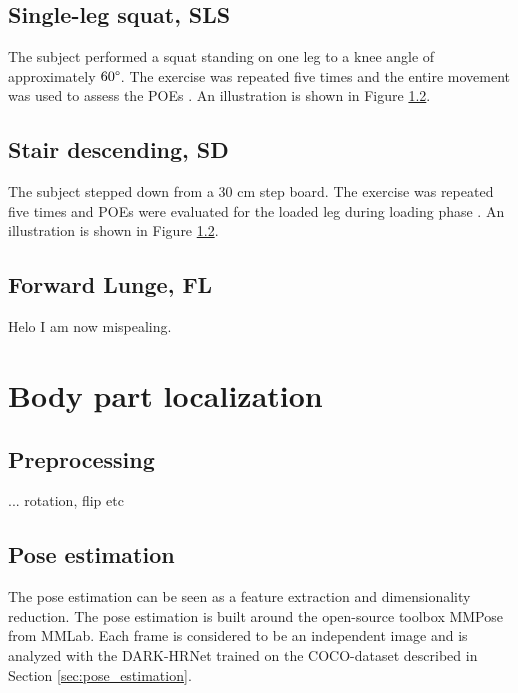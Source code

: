\subsection{Single-leg squat, SLS} \label{sec:met-SLS}
The subject performed a squat standing on one leg to a knee angle of approximately $60\degree$. The exercise was repeated five times and the entire movement was used to assess the POEs \cite{Nae2020}. An illustration is shown in Figure \ref{}.

\subsection{Stair descending, SD}
The subject stepped down from a 30 cm step board. The exercise was repeated five times and POEs were evaluated for the loaded leg during loading phase \cite{Nae2020}. An illustration is shown in Figure \ref{}.

\subsection{Forward Lunge, FL}

Helo I am now mispealing.





\section{Body part localization} \label{sec:met-loc}
\subsection{Preprocessing}
...
rotation, flip etc

\subsection{Pose estimation}
The pose estimation can be seen as a feature extraction and dimensionality reduction.
The pose estimation is built around the open-source toolbox MMPose \cite{mmpose} from MMLab. Each frame is considered to be an independent image and is analyzed with the DARK-HRNet trained on the COCO-dataset \cite{Lin2014} described in Section \ref{sec:pose_estimation}. %


